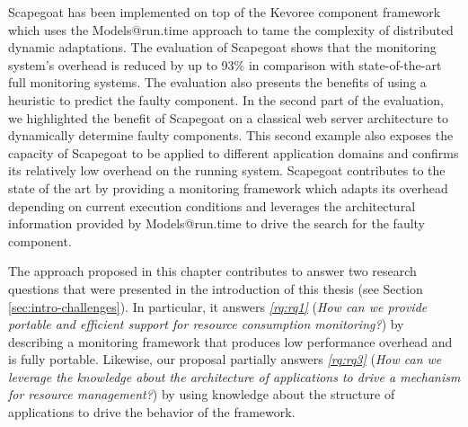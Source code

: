 Scapegoat has been implemented on top of the Kevoree component framework which uses the Models@run.time approach to tame the complexity of distributed dynamic adaptations.
The evaluation of Scapegoat shows that the monitoring system's overhead is reduced by up to 93\% in comparison with state-of-the-art full monitoring systems. 
The evaluation also presents the benefits of using a heuristic to predict the faulty component.
In the second part of the evaluation, we highlighted the benefit of Scapegoat on a classical web server architecture to dynamically determine faulty components.
This second example also exposes the capacity of Scapegoat to be applied to different application domains and confirms its relatively low overhead on the running system.
Scapegoat contributes to the state of the art by providing a monitoring framework which adapts its overhead depending on current execution conditions and leverages the architectural information provided by Models@run.time to drive the search for the faulty component.

The approach proposed in this chapter contributes to answer two research questions that were presented in the introduction of this thesis (see Section \ref{sec:intro-challenges}).
In particular, it answers \textit{\ref{rq:rq1}} (\textit{How can we provide portable and efficient support for resource consumption monitoring?}) by describing a monitoring framework that produces low performance overhead and is fully portable.
Likewise, our proposal partially answers \textit{\ref{rq:rq3}} (\textit{How can we leverage the knowledge about the architecture of applications to drive
a mechanism for resource management?}) by using knowledge about the structure of applications to drive the behavior of the framework.

